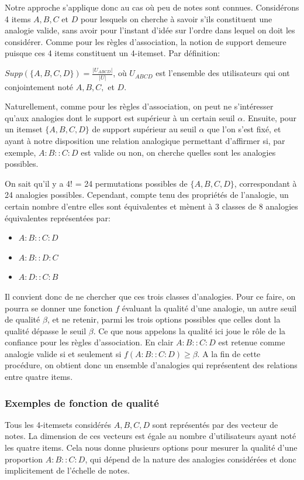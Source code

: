 Notre approche s'applique donc au cas o\`u peu de notes sont connues.  Considérons
4 items  $A, B, C$ et $D$ pour lesquels on cherche à savoir s'ils constituent
une analogie valide, sans avoir pour l'instant d'idée sur l'ordre dans lequel
on doit les considérer. Comme pour les règles d'association, la notion de
support demeure puisque ces 4 items constituent un 4-itemset.  Par
définition:

$Supp(\{A, B, C, D \})= \frac{|U_{ABCD}|}{|U|}$, où $U_{ABCD}$ est l'ensemble
des utilisateurs qui ont conjointement noté $A, B, C,$ et $D$.

Naturellement, comme pour les règles d'association, on peut ne
s'intéresser qu'aux analogies dont le support est supérieur à un certain
seuil $\alpha$.  Ensuite, pour un itemset $\{A, B, C, D \}$ de support
supérieur au seuil $\alpha$ que l'on s'est fixé, et ayant à notre
disposition une relation analogique permettant d'affirmer si, par exemple,
$A:B::C:D$ est valide ou non, on cherche quelles sont les analogies possibles.

On sait qu'il y a 4! = 24 permutations possibles de $\{A, B, C, D \}$,
correspondant à 24 analogies possibles. Cependant, compte tenu des
propriétés de l'analogie, un certain nombre d'entre elles sont
équivalentes et mènent à 3 classes de 8 analogies équivalentes
représentées par:
\begin{itemize}
\item $A:B::C:D$
\item $A:B::D:C$
\item $A:D::C:B$
\end{itemize}
Il convient donc de ne chercher que ces trois classes d'analogies.  Pour ce
faire, on pourra se donner une fonction $f$ évaluant la qualité d'une
analogie, un autre seuil de qualité $\beta$, et ne retenir, parmi les trois
options possibles que celles dont la qualité dépasse le seuil $\beta$. Ce que
nous appelons la qualité ici joue le rôle de la confiance pour les règles
d'association.  En clair $A:B::C:D$ est retenue comme analogie  valide si et
seulement si $f(A:B::C:D) \geq \beta$.  A la fin de cette procédure, on obtient
donc un ensemble d'analogies qui représentent des relations entre quatre items.

\subsubsection{Exemples de fonction de qualité}
Tous les 4-itemsets considérés $A, B, C, D$ sont représentés par
des vecteur de notes.  La dimension de ces vecteurs est égale au nombre
d'utilisateurs ayant noté les quatre items.  Cela nous donne plusieurs options
pour mesurer la qualité d'une proportion $A:B::C:D$, qui dépend de la nature
des analogies considérées et donc implicitement de l'échelle de notes.

